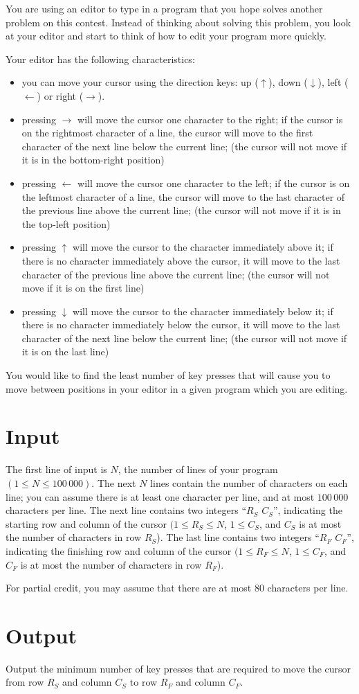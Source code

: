 You are using an editor to type in a program that you hope solves another problem on this contest.
Instead of thinking about solving this problem, you look at your editor and start to think of how to
edit your program more quickly.

Your editor has the following characteristics:
\begin{itemize}
  \item you can move your cursor using the direction keys: up ($\uparrow$), down ($\downarrow$),
  left ($\leftarrow$) or right ($\rightarrow$).

  \item pressing $\rightarrow$ will move the cursor one character to the right; if the cursor is on
  the rightmost character of a line, the cursor will move to the first character of the next line
  below the current line; (the cursor will not move if it is in the bottom-right position)

  \item pressing $\leftarrow$ will move the cursor one character to the left; if the cursor is on
  the leftmost character of a line, the cursor will move to the last character of the previous
  line above the current line; (the cursor will not move if it is in the top-left position)

  \item pressing $\uparrow$ will move the cursor to the character immediately above it; if there is
  no character immediately above the cursor, it will move to the last character of the previous
  line above the current line; (the cursor will not move if it is on the first line)

  \item pressing $\downarrow$ will move the cursor to the character immediately below it; if there
  is no character immediately below the cursor, it will move to the last character of the next
  line below the current line; (the cursor will not move if it is on the last line)
\end{itemize}

You would like to find the least number of key presses that will cause you to move between positions in your editor in a given program which you are editing.

\section*{Input}
The first line of input is $N$, the number of lines of your program $(1 \leq N \leq 100\,000)$. The
next $N$ lines contain the number of characters on each line; you can assume there is at least one
character per line, and at most $100\,000$ characters per line. The next line contains two integers
``$R_S$ $C_S$'', indicating the starting row and column of the cursor $(1 \leq R_S \leq N$, $1 \leq
C_S$, and $C_S$ is at most the number of characters in row $R_S$). The last line contains two integers
``$R_F$ $C_F$'', indicating the finishing row and column of the cursor $(1 \leq R_F \leq N$, $1
\leq C_F$, and $C_F$ is at most the number of characters in row $R_F$).

For partial credit, you may assume that there are at most $80$ characters per line.

\section*{Output}
Output the minimum number of key presses that are required to move the cursor from row $R_S$ and
column $C_S$ to row $R_F$ and column $C_F$.
